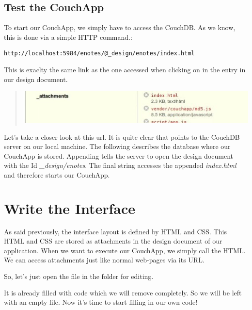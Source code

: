 \documentclass[letterpaper,10pt,english]{sphinxmanual}
\begin{document}
\section{Test the CouchApp}
\label{2-Start:test-the-couchapp}
To start our CouchApp, we simply have to access the CouchDB. As we know, this is done via a simple HTTP command.:

\begin{Verbatim}[commandchars=@\[\]]
http://localhost:5984/enotes/@_design/enotes/index.html
\end{Verbatim}

This is exaclty the same link as the one accessed when clicking on  in the  entry in our design document.
\begin{quote}

\includegraphics{2_index.jpg}
\end{quote}

Let's take a closer look at this url. It is quite clear that  points to the CouchDB server on our local machine. The following  describes the database where our CouchApp is stored. Appending  tells the server to open the design document with the Id \emph{\_design/enotes}. The final string  accesses the appended \emph{index.html} and therefore starts our CouchApp.


\chapter{Write the Interface}
\label{3-Interface:write-the-interface}\label{3-Interface::doc}
As said previously, the interface layout is defined by HTML and CSS. This HTML and CSS are stored as attachments in the design document of our application. When we want to execute our CouchApp, we simply call the HTML. We can access attachments just like normal web-pages via its URL.

So, let's just open the file  in the folder  for editing.

It is already filled with code which we will remove completely. So we will be left with an empty file. Now it's time to start filling in our own code!
\end{document}
